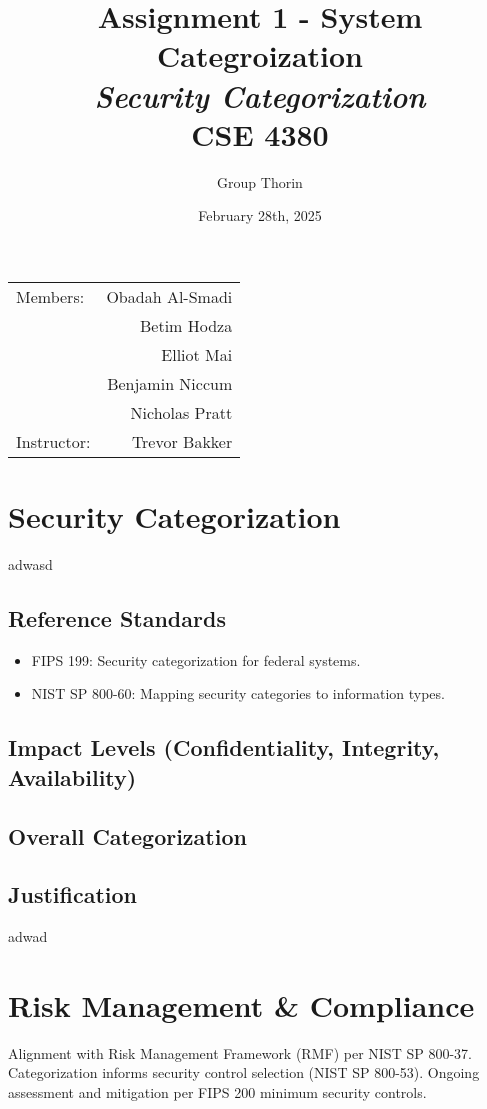 \documentclass{article}
\title{Assignment 1 - System Categroization \\ \textit{Security Categorization}\\ CSE 4380}
\author{Group Thorin}
\date{February 28th, 2025}
\begin{document}
\maketitle
\begin{center}
\begin{tabular}{l r}

Members: 	& Obadah Al-Smadi\\
			& Betim Hodza\\
			& Elliot Mai\\
			& Benjamin Niccum\\
        	& Nicholas Pratt\\
Instructor: & Trevor Bakker\end{tabular}
\end{center}

\newpage

\setcounter{tocdepth}{2}
\tableofcontents
\newpage

\listoffigures
\listoftables
\newpage

\section{Security Categorization}
 adwasd
\subsection{Reference Standards}
\begin{itemize}
    \item FIPS 199: Security categorization for federal systems.
    \item NIST SP 800-60: Mapping security categories to information types.
\end{itemize}

\subsection{Impact Levels (Confidentiality, Integrity, Availability)}


\subsection{Overall Categorization}

\subsection{Justification}
adwad
\newpage

\section{Risk Management \& Compliance}

Alignment with Risk Management Framework (RMF) per NIST SP 800-37. Categorization informs security control selection (NIST SP 800-53). Ongoing assessment and mitigation per FIPS 200 minimum security controls.
\end{document}
